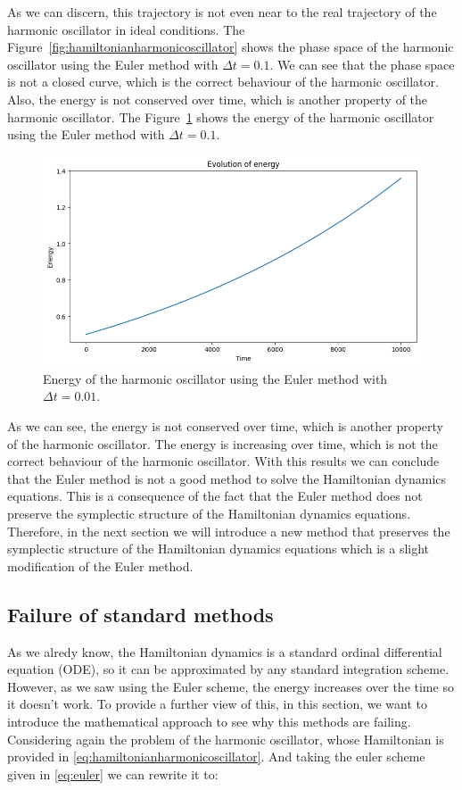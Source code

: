 \documentclass{report}
\begin{document}
As we can discern, this trajectory is not even near to the real trajectory of the harmonic oscillator in ideal conditions. The Figure~\ref{fig:hamiltonianharmonicoscillator} shows the phase space of the harmonic oscillator using the Euler method with \(\Delta t = 0.1\). We can see that the phase space is not a closed curve, which is the correct behaviour of the harmonic oscillator. Also, the energy is not conserved over time, which is another property of the harmonic oscillator. The Figure~\ref{fig:hamiltonianharmonicoscillatorenergy} shows the energy of the harmonic oscillator using the Euler method with \(\Delta t = 0.1\).

\begin{figure}[H]
	\centering
	\includegraphics[width=0.5\linewidth]{./Figures/Sympletic/eulerenergy1.png}
	\caption{Energy of the harmonic oscillator using the Euler method with \(\Delta t = 0.01\).}
	\label{fig:hamiltonianharmonicoscillatorenergy}
\end{figure}

As we can see, the energy is not conserved over time, which is another property of the harmonic oscillator. The energy is increasing over time, which is not the correct behaviour of the harmonic oscillator. With this results we can conclude that the Euler method is not a good method to solve the Hamiltonian dynamics equations. This is a consequence of the fact that the Euler method does not preserve the symplectic structure of the Hamiltonian dynamics equations. Therefore, in the next section we will introduce a new method that preserves the symplectic structure of the Hamiltonian dynamics equations which is a slight modification of the Euler method.

\subsection{Failure of standard methods}
\label{sec:failure_standard_methods}

As we alredy know, the Hamiltonian dynamics is a standard ordinal differential equation (ODE), so it can be approximated by any standard integration scheme. However, as we saw using the Euler scheme, the energy increases over the time so it doesn't work. To provide a further view of this, in this section, we want to introduce the mathematical approach to see why this methods are failing. Considering again the problem of the harmonic oscillator, whose Hamiltonian is provided in \ref{eq:hamiltonianharmonicoscillator}. And taking the euler scheme given in \ref{eq:euler} we can rewrite it to:
\end{document}
